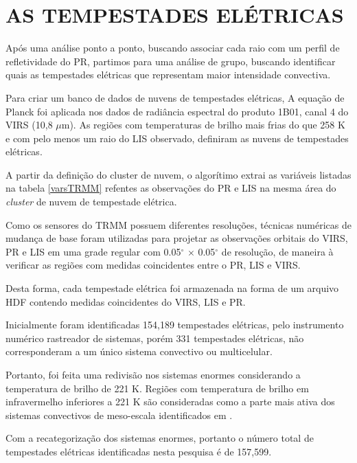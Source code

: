 \section{AS TEMPESTADES ELÉTRICAS}

Após uma análise ponto a ponto, buscando associar cada raio com um perfil de refletividade do PR, partimos para uma análise de grupo, buscando identificar quais as tempestades elétricas que representam maior intensidade convectiva.

Para criar um banco de dados de nuvens de tempestades elétricas, A equação de Planck foi aplicada nos dados de radiância espectral do produto 1B01, canal 4 do VIRS (10,8 $\mu$m). As regiões com temperaturas de brilho mais frias do que 258 K e com pelo menos um raio do LIS observado, definiram as nuvens de tempestades elétricas.


A partir da definição do cluster de nuvem, o algorítimo extrai as variáveis listadas na tabela \ref{varsTRMM} refentes as observações do PR e LIS na mesma área do \textit{cluster} de nuvem de tempestade elétrica.

Como os sensores do TRMM possuem diferentes resoluções, técnicas numéricas de mudança de base foram utilizadas para projetar as observações orbitais do VIRS, PR e LIS em uma grade regular com 0.05$^{\circ}$ $\times$ 0.05$^{\circ}$ de resolução, de maneira à verificar as regiões com medidas coincidentes entre o PR, LIS e VIRS.


Desta forma, cada tempestade elétrica foi armazenada na forma de um arquivo HDF contendo medidas coincidentes do VIRS, LIS e PR. 

Inicialmente foram identificadas 154,189 tempestades elétricas, pelo instrumento numérico rastreador de sistemas, porém 331 tempestades elétricas, não corresponderam a um único sistema convectivo ou multicelular. 

Portanto, foi feita uma redivisão nos sistemas enormes considerando a temperatura de brilho de 221 K. Regiões com temperatura de brilho em infravermelho inferiores a 221 K são consideradas como a parte mais ativa dos sistemas convectivos de meso-escala identificados em . 

Com a recategorização dos sistemas enormes, portanto o número total de tempestades elétricas identificadas nesta pesquisa é de 157,599.


